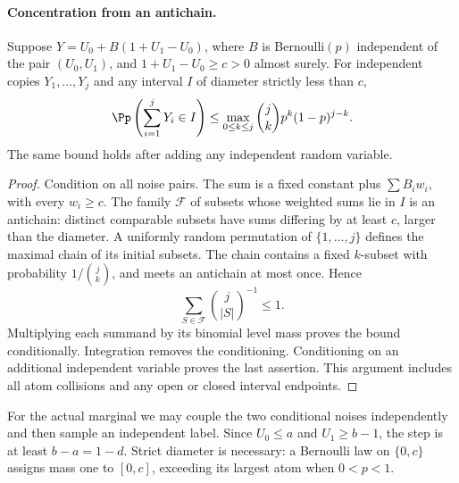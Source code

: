 \paragraph{Concentration from an antichain.}
\begin{lemma}
Suppose $Y=U_0+B(1+U_1-U_0)$, where $B$ is Bernoulli$(p)$ independent
of the pair $(U_0,U_1)$, and $1+U_1-U_0\ge c>0$ almost surely.
For independent copies $Y_1,\ldots,Y_j$ and any interval $I$ of diameter
strictly less than $c$,
\[
 \Pp\left(\sum_{i=1}^jY_i\in I\right)
 \le \max_{0\le k\le j}\binom jk p^k(1-p)^{j-k}.
\]
The same bound holds after adding any independent random variable.
\end{lemma}
\begin{proof}
Condition on all noise pairs. The sum is a fixed constant plus
$\sum B_iw_i$, with every $w_i\ge c$. The family $\mathcal F$ of subsets
whose weighted sums lie in $I$ is an antichain: distinct comparable
subsets have sums differing by at least $c$, larger than the diameter.
A uniformly random permutation of $\{1,\ldots,j\}$ defines the maximal
chain of its initial subsets. The chain contains a fixed $k$-subset with
probability $1/\binom jk$, and meets an antichain at most once. Hence
\[
 \sum_{S\in\mathcal F}\binom j{|S|}^{-1}\le1.
\]
Multiplying each summand by its binomial level mass proves the bound
conditionally. Integration removes the conditioning. Conditioning on an
additional independent variable proves the last assertion. This argument
includes all atom collisions and any open or closed interval endpoints.
\end{proof}
For the actual marginal we may couple the two conditional noises
independently and then sample an independent label. Since $U_0\le a$ and
$U_1\ge b-1$, the step is at least $b-a=1-d$.
Strict diameter is necessary: a Bernoulli law on $\{0,c\}$ assigns mass
one to $[0,c]$, exceeding its largest atom when $0<p<1$.

